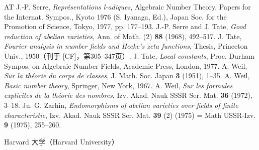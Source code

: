 \begin{thebibliography}{AT}
 J.-P. Serre, \emph{Représentations l-adiques}, Algebraic Number Theory, Papers for the Internat. Sympos., Kyoto 1976 (S. Iyanaga, Ed.), Japan Soc. for the Promotion of Science, Tokyo, 1977, pp. 177--193.
 J.-P. Serre and J. Tate, \emph{Good reduction of abelian varieties}, Ann. of Math. (2) \textbf{88} (1968), 492--517.
 J. Tate, \emph{Fourier analysis in number fields and Hecke's zeta functions}, Thesis, Princeton Univ., 1950（刊于 [CF]，第305--347页）.
 J. Tate, \emph{Local constants}, Proc. Durham Sympos. on Algebraic Number Fields, Academic Press, London, 1977.
 A. Weil, \emph{Sur la théorie du corps de classes}, J. Math. Soc. Japan \textbf{3} (1951), 1--35.
 A. Weil, \emph{Basic number theory}, Springer, New York, 1967.
 A. Weil, \emph{Sur les formules explicites de la théorie des nombres}, Izv. Akad. Nauk SSSR Ser. Mat. \textbf{36} (1972), 3--18.
 Ju. G. Zarhin, \emph{Endomorphisms of abelian varieties over fields of finite characteristic}, Izv. Akad. Nauk SSSR Ser. Mat. \textbf{39} (2) (1975) = Math USSR-Izv. \textbf{9} (1975), 255--260.
\end{thebibliography}
\begin{flushright}Harvard 大学（Harvard University）\end{flushright}
